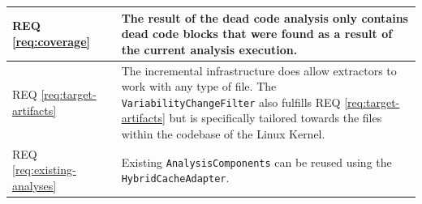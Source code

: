 \documentclass[a4paper]{article}
\newcommand{\cmark}{\ding{51}}%
\begin{document}
\begin{longtable}{ |  L{0.17\textwidth} | C{0.12\textwidth} | L{0.63\textwidth} |}
	REQ \ref{req:coverage} & \cmark & The result of the dead code analysis only contains dead code blocks that were found as a result of the current analysis execution.\\ \hline
	REQ \ref{req:target-artifacts} & \cmark & The incremental infrastructure does allow extractors to work with any type of file. The \texttt{VariabilityChangeFilter} also fulfills REQ \ref{req:target-artifacts}  but is specifically tailored towards the files within the codebase of the Linux Kernel.\\ \hline
	REQ \ref{req:existing-analyses} & \cmark & Existing \texttt{AnalysisComponents}  can be reused using the \texttt{Hybrid\-Cache\-Adapter}.\\ \hline


	
\end{longtable}
\end{document}
